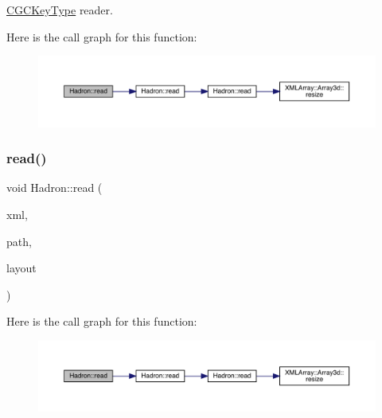 \mbox{\hyperlink{structHadron_1_1CGCKeyType}{C\+G\+C\+Key\+Type}} reader. 

Here is the call graph for this function\+:\nopagebreak
\begin{figure}[H]
\begin{center}
\leavevmode
\includegraphics[width=350pt]{d1/daf/namespaceHadron_a32f04cfa14604e9b40e037d78c0fad86_cgraph}
\end{center}
\end{figure}
\mbox{\label{namespaceHadron_a2c6adb72eb12fa49cb7c0c7d15aa4aba}} 
\subsubsection{\texorpdfstring{read()}{read()}\hspace{0.1cm}{\footnotesize\ttfamily [5/94]}}
{\footnotesize\ttfamily void Hadron\+::read (\begin{DoxyParamCaption}\item[{\mbox{\hyperlink{classADATXML_1_1XMLReader}{X\+M\+L\+Reader}} \&}]{xml,  }\item[{const std\+::string \&}]{path,  }\item[{\mbox{\hyperlink{structHadron_1_1Layout_1_1Layout__t}{Layout\+::\+Layout\+\_\+t}} \&}]{layout }\end{DoxyParamCaption})}

Here is the call graph for this function\+:\nopagebreak
\begin{figure}[H]
\begin{center}
\leavevmode
\includegraphics[width=350pt]{d1/daf/namespaceHadron_a2c6adb72eb12fa49cb7c0c7d15aa4aba_cgraph}
\end{center}
\end{figure}
\mbox{\label{namespaceHadron_ab8d127a4d4a1ca38aae1b0d45226789e}} 
